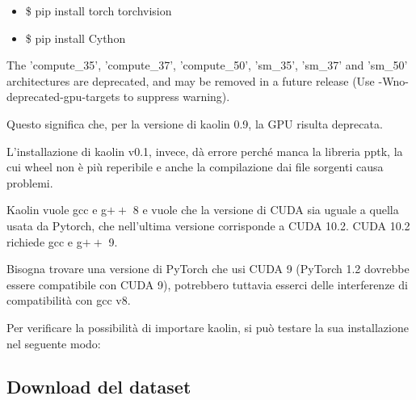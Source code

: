 \medskip

\begin{itemize}
\item \$ pip install torch torchvision
\item \$ pip install Cython
\end{itemize}



\medskip



 The 'compute\_35', 'compute\_37', 'compute\_50', 'sm\_35', 
'sm\_37' and 'sm\_50' architectures are deprecated, 
and may be removed in a future release (Use -Wno-deprecated-gpu-targets to suppress warning).



\medskip

Questo significa che, per la versione di kaolin 0.9, la GPU risulta deprecata.

\medskip

L’installazione di kaolin v0.1, invece, dà errore perché manca la libreria pptk, la cui wheel non è più reperibile e anche la compilazione dai file sorgenti causa problemi.

\medskip

Kaolin vuole gcc e g$++$ 8 e vuole che la versione di CUDA sia uguale a quella usata da Pytorch, che nell’ultima versione corrisponde a CUDA 10.2.
CUDA 10.2 richiede  gcc e g$++$ 9.

\medskip

Bisogna trovare una versione di PyTorch che usi CUDA 9 (PyTorch 1.2 dovrebbe essere compatibile con CUDA 9), potrebbero tuttavia esserci delle interferenze di compatibilità con gcc v8.

\medskip

Per verificare la possibilità di importare kaolin, si può testare la sua installazione nel seguente modo:

\medskip






\newpage

\subsection{Download del dataset}

\medskip\medskip\medskip





